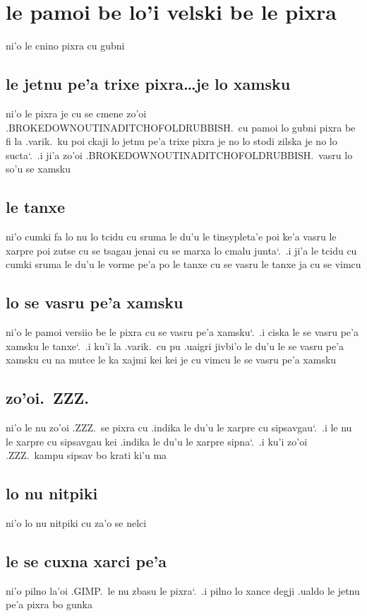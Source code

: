\documentclass{report}
\newcommand\sds{\spacefactor\sfcode`.\ \space}
\begin{document}
\section{le pamoi be lo'i velski be le pixra}
ni'o le cnino pixra cu gubni

\subsection{le jetnu pe'a trixe pixra\ldots je lo xamsku}
ni'o le pixra je cu se cmene zo'oi .BROKEDOWNOUTINADITCHOFOLDRUBBISH.\ cu pamoi lo gubni pixra be fi la .varik.\ ku poi ckaji lo jetnu pe'a trixe pixra je no lo stodi zilska je no lo sucta\sds  .i ji'a zo'oi .BROKEDOWNOUTINADITCHOFOLDRUBBISH.\ vasru lo so'u se xamsku

\subsection{le tanxe}
ni'o cumki fa lo nu lo tcidu cu sruma le du'u le tinsypleta'e poi ke'a vasru le xarpre poi zutse cu se tsagau jenai cu se marxa lo cmalu junta\sds  .i ji'a le tcidu cu cumki sruma le du'u le vorme pe'a po le tanxe cu se vasru le tanxe ja cu se vimcu

\subsection{lo se vasru pe'a xamsku}
ni'o le pamoi versiio be le pixra cu se vasru pe'a xamsku\sds  .i ciska le se vasru pe'a xamsku le tanxe\sds  .i ku'i la .varik.\ cu pu .uaigri jivbi'o le du'u le se vasru pe'a xamsku cu na mutce le ka xajmi kei kei je cu vimcu le se vasru pe'a xamsku

\subsection{zo'oi.\ ZZZ.}
ni'o le nu zo'oi .ZZZ.\ se pixra cu .indika le du'u le xarpre cu sipsavgau\sds  .i le nu le xarpre cu sipsavgau kei .indika le du'u le xarpre sipna\sds  .i ku'i zo'oi .ZZZ.\ kampu sipsav bo krati ki'u ma

\subsection{lo nu nitpiki}
ni'o lo nu nitpiki cu za'o se nelci

\subsection{le se cuxna xarci pe'a}
ni'o pilno la'oi .GIMP.\ le nu zbasu le pixra\sds  .i pilno lo xance degji .ualdo le jetnu pe'a pixra bo gunka
\end{document}

